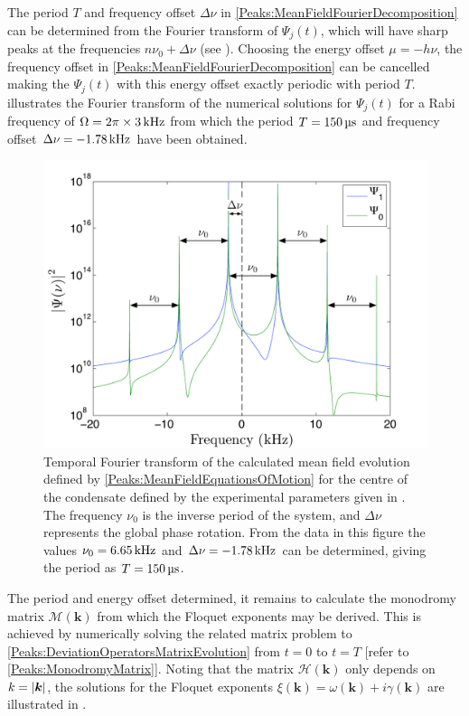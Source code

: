 The period $T$ and frequency offset $\Delta\nu$ in \eqref{Peaks:MeanFieldFourierDecomposition} can be determined from the Fourier transform of $\Psi_j(t)$, which will have sharp peaks at the frequencies $n \nu_0 + \Delta \nu$ (see ). Choosing the energy offset $\mu=-h \nu$, the frequency offset in \eqref{Peaks:MeanFieldFourierDecomposition} can be cancelled making the $\Psi_j(t)$ with this energy offset exactly periodic with period $T$.  illustrates the Fourier transform of the numerical solutions for $\Psi_j(t)$ for a Rabi frequency of $\Omega = 2 \pi \times \unit[3]{kHz}$ from which the period $T=\unit[150]{\micro{}s}$ and frequency offset $\Delta \nu = \unit[-1.78]{kHz}$ have been obtained.

\begin{figure}
    \centering
    \includegraphics[width=14cm]{MeanFieldFourierTransform}
    \caption{Temporal Fourier transform of the calculated mean field evolution defined by \eqref{Peaks:MeanFieldEquationsOfMotion} for the centre of the condensate defined by the experimental parameters given in . The frequency $\nu_0$ is the inverse period of the system, and $\Delta\nu$ represents the global phase rotation. From the data in this figure the values $\nu_0 = \unit[6.65]{kHz}$ and $\Delta\nu = \unit[-1.78]{kHz}$ can be determined, giving the period as $T=\unit[150]{\micro{}s}$. \label{Peaks:MeanFieldFourierTransform}}
\end{figure}

The period and energy offset determined, it remains to calculate the mono\-dromy matrix $\mathcal{M}(\bm{k})$ from which the Floquet exponents may be derived. This is achieved by numerically solving the related matrix problem to \eqref{Peaks:DeviationOperatorsMatrixEvolution} from $t=0$ to $t=T$ [refer to \eqref{Peaks:MonodromyMatrix}]. Noting that the matrix $\mathcal{H}(\bm{k})$ only depends on $k = \left|\bm{k}\right|$, the solutions for the Floquet exponents $\xi(\bm{k}) = \omega(\bm{k}) + i\gamma(\bm{k})$ are illustrated in .

